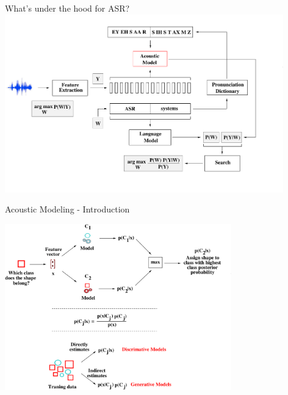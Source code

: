 \begin{frame}{What's under the hood for ASR?}
\includegraphics[height=77mm]{figures/b2}
\end{frame}

\begin{frame}{Acoustic Modeling - Introduction}
\begin{center}
\includegraphics[height=72mm]{figures/am}
\end{center}
\end{frame}

